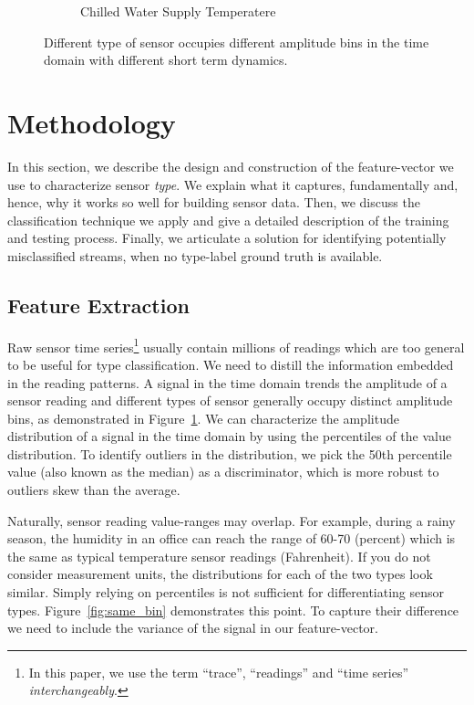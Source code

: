 \begin{figure}[ht!]
\begin{subfigure}{0.32\textwidth}
                \caption{Chilled Water Supply Temperatere}
  \end{subfigure}
\caption{Different type of sensor occupies different amplitude bins in the time domain with different short term dynamics.}
\label{fig:example}
\end{figure}

\section{Methodology}
In this section, we describe the design and construction of the feature-vector we use to characterize sensor \emph{type}.  We
explain what it captures, fundamentally and, hence, why it works so well for building sensor data. Then, we discuss
the classification technique we apply and give a detailed description of the training and testing process. Finally, we articulate
a solution for identifying potentially misclassified streams, when no type-label ground truth is available.

\subsection{Feature Extraction}
Raw sensor time series\footnote{In this paper, we use the term ``trace'', ``readings'' and ``time series'' \textit{interchangeably}.} usually contain millions of readings which are too general to be useful for type classification.   We need to distill the information embedded in the reading patterns.
A signal in the time domain trends the amplitude of a sensor reading and different types of sensor generally occupy distinct
amplitude bins, as demonstrated in Figure~\ref{fig:example}. We can characterize the amplitude distribution of a signal in the time
domain by using the percentiles of the value distribution.%
To identify outliers in the distribution, we pick the 50th percentile value (also known as the median) as a discriminator, which
is more robust to outliers skew than the average. 

Naturally, sensor reading value-ranges may overlap. For example, during a rainy season, the humidity in an
office can reach the range of 60-70 (percent) which is the same as typical temperature sensor readings (Fahrenheit).
If you do not consider measurement units, the distributions for each of the two types look similar. 
Simply relying on percentiles is not sufficient for differentiating sensor types. Figure~\ref{fig:same_bin} demonstrates this
point. To capture their difference we need to include the variance of the signal in our feature-vector.

